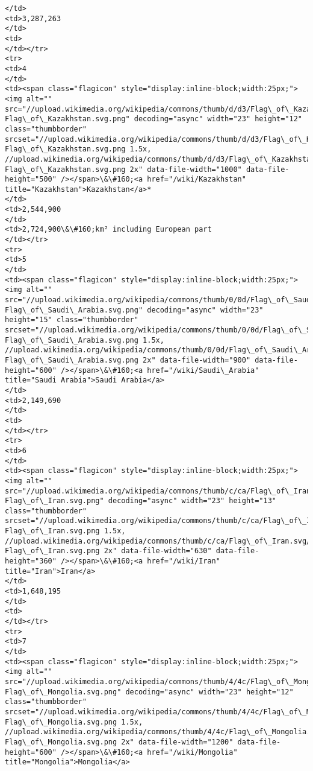 \documentclass[11pt]{article}
\begin{document}
\begin{Verbatim}[commandchars=\\\{\}]
</td>
<td>3,287,263
</td>
<td>
</td></tr>
<tr>
<td>4
</td>
<td><span class="flagicon" style="display:inline-block;width:25px;"><img alt="" src="//upload.wikimedia.org/wikipedia/commons/thumb/d/d3/Flag\_of\_Kazakhstan.svg/23px-Flag\_of\_Kazakhstan.svg.png" decoding="async" width="23" height="12" class="thumbborder" srcset="//upload.wikimedia.org/wikipedia/commons/thumb/d/d3/Flag\_of\_Kazakhstan.svg/35px-Flag\_of\_Kazakhstan.svg.png 1.5x, //upload.wikimedia.org/wikipedia/commons/thumb/d/d3/Flag\_of\_Kazakhstan.svg/46px-Flag\_of\_Kazakhstan.svg.png 2x" data-file-width="1000" data-file-height="500" /></span>\&\#160;<a href="/wiki/Kazakhstan" title="Kazakhstan">Kazakhstan</a>*
</td>
<td>2,544,900
</td>
<td>2,724,900\&\#160;km² including European part
</td></tr>
<tr>
<td>5
</td>
<td><span class="flagicon" style="display:inline-block;width:25px;"><img alt="" src="//upload.wikimedia.org/wikipedia/commons/thumb/0/0d/Flag\_of\_Saudi\_Arabia.svg/23px-Flag\_of\_Saudi\_Arabia.svg.png" decoding="async" width="23" height="15" class="thumbborder" srcset="//upload.wikimedia.org/wikipedia/commons/thumb/0/0d/Flag\_of\_Saudi\_Arabia.svg/35px-Flag\_of\_Saudi\_Arabia.svg.png 1.5x, //upload.wikimedia.org/wikipedia/commons/thumb/0/0d/Flag\_of\_Saudi\_Arabia.svg/45px-Flag\_of\_Saudi\_Arabia.svg.png 2x" data-file-width="900" data-file-height="600" /></span>\&\#160;<a href="/wiki/Saudi\_Arabia" title="Saudi Arabia">Saudi Arabia</a>
</td>
<td>2,149,690
</td>
<td>
</td></tr>
<tr>
<td>6
</td>
<td><span class="flagicon" style="display:inline-block;width:25px;"><img alt="" src="//upload.wikimedia.org/wikipedia/commons/thumb/c/ca/Flag\_of\_Iran.svg/23px-Flag\_of\_Iran.svg.png" decoding="async" width="23" height="13" class="thumbborder" srcset="//upload.wikimedia.org/wikipedia/commons/thumb/c/ca/Flag\_of\_Iran.svg/35px-Flag\_of\_Iran.svg.png 1.5x, //upload.wikimedia.org/wikipedia/commons/thumb/c/ca/Flag\_of\_Iran.svg/46px-Flag\_of\_Iran.svg.png 2x" data-file-width="630" data-file-height="360" /></span>\&\#160;<a href="/wiki/Iran" title="Iran">Iran</a>
</td>
<td>1,648,195
</td>
<td>
</td></tr>
<tr>
<td>7
</td>
<td><span class="flagicon" style="display:inline-block;width:25px;"><img alt="" src="//upload.wikimedia.org/wikipedia/commons/thumb/4/4c/Flag\_of\_Mongolia.svg/23px-Flag\_of\_Mongolia.svg.png" decoding="async" width="23" height="12" class="thumbborder" srcset="//upload.wikimedia.org/wikipedia/commons/thumb/4/4c/Flag\_of\_Mongolia.svg/35px-Flag\_of\_Mongolia.svg.png 1.5x, //upload.wikimedia.org/wikipedia/commons/thumb/4/4c/Flag\_of\_Mongolia.svg/46px-Flag\_of\_Mongolia.svg.png 2x" data-file-width="1200" data-file-height="600" /></span>\&\#160;<a href="/wiki/Mongolia" title="Mongolia">Mongolia</a>

\end{Verbatim}
\end{document}
